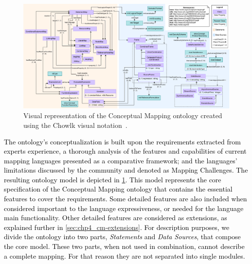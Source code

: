 \begin{figure}
    \centering
    \includegraphics[width=1\linewidth]{figures/chp4-2_cm_diagram.pdf}
    \caption[Conceptual Mapping ontology overview]{Visual representation of the Conceptual Mapping ontology created using the Chowlk visual notation~\cite{feria2022chowlk}.}
    \label{fig:chp4-2_cm_diagram}
\end{figure}

\textcolor{black}{The ontology's conceptualization is built upon the requirements extracted from experts experience, a thorough analysis of the features and capabilities of current mapping languages presented as a comparative framework; and the languages' limitations discussed by the community and denoted as Mapping Challenges. The resulting ontology model is depicted in \cref{fig:chp4-2_cm_diagram}. This model represents the core specification of the Conceptual Mapping ontology that contains the essential features to cover the requirements. Some detailed features are also included when considered important to the language expressiveness, or needed for the language main functionality. Other detailed features are considered as extensions, as explained further in \cref{sec:chp4_cm-extensions}. For description purposes, we divide the ontology into two parts, \textit{Statements} and \textit{Data Sources}, that compose the core model. These two parts, when not used in combination, cannot describe a complete mapping. For that reason they are not separated into single modules. } 


